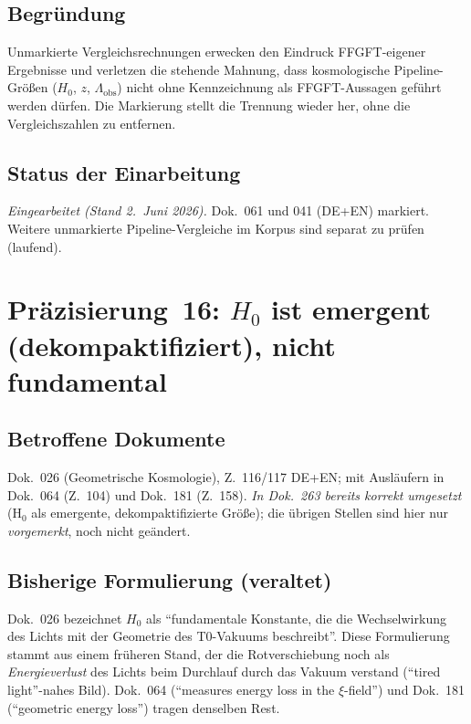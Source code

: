 \subsection*{Begründung}

Unmarkierte Vergleichsrechnungen erwecken den Eindruck FFGFT-eigener
Ergebnisse und verletzen die stehende Mahnung, dass kosmologische
Pipeline-Größen ($H_0$, $z$, $\Lambda_{\text{obs}}$) nicht ohne Kennzeichnung
als FFGFT-Aussagen geführt werden dürfen. Die Markierung stellt die Trennung
wieder her, ohne die Vergleichszahlen zu entfernen.

\subsection*{Status der Einarbeitung}

\emph{Eingearbeitet (Stand 2.~Juni 2026).} Dok.~061 und 041 (DE+EN) markiert.
Weitere unmarkierte Pipeline-Vergleiche im Korpus sind separat zu prüfen
(laufend).

\section{\texorpdfstring{Präzisierung~16: $H_0$ ist emergent (dekompaktifiziert), nicht fundamental}{Praezisierung 16: H0 ist emergent, nicht fundamental}}

\subsection*{Betroffene Dokumente}

Dok.~026 (Geometrische Kosmologie), Z.~116/117 DE+EN; mit Ausläufern in
Dok.~064 (Z.~104) und Dok.~181 (Z.~158). \emph{In Dok.~263 bereits korrekt
umgesetzt} (H$_0$ als emergente, dekompaktifizierte Größe); die übrigen
Stellen sind hier nur \emph{vorgemerkt}, noch nicht geändert.

\subsection*{Bisherige Formulierung (veraltet)}

Dok.~026 bezeichnet $H_0$ als \enquote{fundamentale Konstante, die die
Wechselwirkung des Lichts mit der Geometrie des T0-Vakuums beschreibt}. Diese
Formulierung stammt aus einem früheren Stand, der die Rotverschiebung noch als
\emph{Energieverlust} des Lichts beim Durchlauf durch das Vakuum verstand
(\enquote{tired light}-nahes Bild). Dok.~064 (\enquote{measures energy loss in
the $\xi$-field}) und Dok.~181 (\enquote{geometric energy loss}) tragen
denselben Rest.

